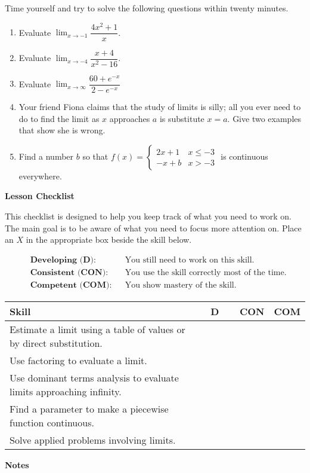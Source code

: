 \documentclass[10pt]{book}
\theoremstyle{definition}
\theoremstyle{remark}
\begin{document}
\begin{large}
\noindent
Time yourself and try to solve the following questions within twenty minutes. 
\begin{enumerate}
\item Evaluate $\displaystyle\lim_{x \rightarrow -1} \dfrac{4x^2 + 1}{x}$.\vfil
\item Evaluate $\displaystyle\lim_{x \rightarrow -4} \dfrac{x+4}{x^{2} - 16}$.\vfil
\item Evaluate $\displaystyle\lim_{x \rightarrow \infty} \dfrac{60+e^{-x}}{2-e^{-x}}$ \vfil
\item Your friend Fiona claims that the study of limits is silly; all you ever need to do to find the limit as $x$ approaches $a$ is substitute $x = a$. Give two examples that show she is wrong.\vfil
\item Find a number $b$ so that $f(x) = \begin{cases} 2x +1 & x \leq -3 \\ -x + b & x > -3 \end{cases}$ is continuous everywhere.
\end{enumerate}

\noindent
\textbf{Lesson Checklist}
\bigskip

\noindent
This checklist is designed to help you keep track of what you need to work on. The main goal is to be aware of what you need to focus more attention on. Place an $X$ in the appropriate box beside the skill below. 
\bigskip

\noindent
\begin{align*}
&\textbf{Developing (D):} &&\textrm{You still need to work on this skill.}\\
&\textbf{Consistent (CON):} &&\textrm{You use the skill correctly most of the time.}\\
&\textbf{Competent (COM):} &&\textrm{You show mastery of the skill.} 
\end{align*}
\vfil

\begin{center}
\begin{tabular}{|l|l|l|l|}
\hline
\textbf{Skill} & \textbf{~~D~~} & \textbf{CON} & \textbf{COM} \\
\hline
Estimate a limit using a table of values or by direct substitution.&&&\\
\hline
Use factoring to evaluate a limit.&&&\\
\hline
Use dominant terms analysis to evaluate limits approaching infinity.&&&\\
\hline
Find a parameter to make a piecewise function continuous.&&&\\
\hline
Solve applied problems involving limits.&&&\\
\hline
\end{tabular}
\end{center}
 \vfil

\noindent
\textbf{Notes}
\end{large} \vfil
\newpage
\end{document}
